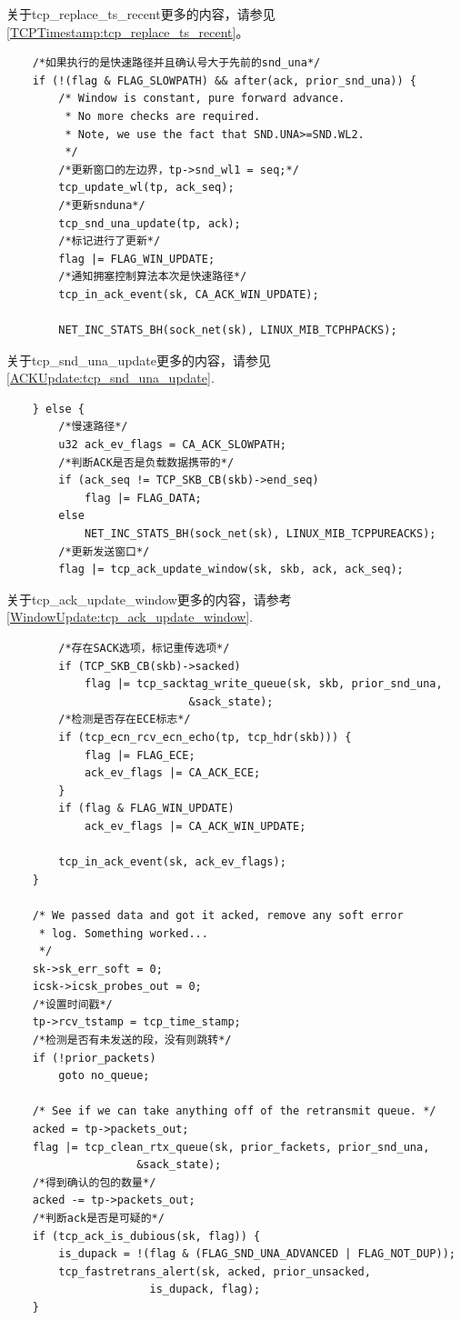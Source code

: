 	关于tcp\_replace\_ts\_recent更多的内容，请参见\ref{TCPTimestamp:tcp_replace_ts_recent}。

\begin{verbatim}
	/*如果执行的是快速路径并且确认号大于先前的snd_una*/
	if (!(flag & FLAG_SLOWPATH) && after(ack, prior_snd_una)) {
		/* Window is constant, pure forward advance.
		 * No more checks are required.
		 * Note, we use the fact that SND.UNA>=SND.WL2.
		 */
		/*更新窗口的左边界，tp->snd_wl1 = seq;*/
		tcp_update_wl(tp, ack_seq);
		/*更新snduna*/
		tcp_snd_una_update(tp, ack);
		/*标记进行了更新*/
		flag |= FLAG_WIN_UPDATE;
		/*通知拥塞控制算法本次是快速路径*/
		tcp_in_ack_event(sk, CA_ACK_WIN_UPDATE);

		NET_INC_STATS_BH(sock_net(sk), LINUX_MIB_TCPHPACKS);
\end{verbatim}

	关于tcp\_snd\_una\_update更多的内容，请参见\ref{ACKUpdate:tcp_snd_una_update}.

\begin{verbatim}
	} else {
		/*慢速路径*/
		u32 ack_ev_flags = CA_ACK_SLOWPATH;
		/*判断ACK是否是负载数据携带的*/
		if (ack_seq != TCP_SKB_CB(skb)->end_seq)
			flag |= FLAG_DATA;
		else
			NET_INC_STATS_BH(sock_net(sk), LINUX_MIB_TCPPUREACKS);
		/*更新发送窗口*/
		flag |= tcp_ack_update_window(sk, skb, ack, ack_seq);
\end{verbatim}

	关于tcp\_ack\_update\_window更多的内容，请参考\ref{WindowUpdate:tcp_ack_update_window}.

\begin{verbatim}
		/*存在SACK选项，标记重传选项*/
		if (TCP_SKB_CB(skb)->sacked)
			flag |= tcp_sacktag_write_queue(sk, skb, prior_snd_una,
							&sack_state);
		/*检测是否存在ECE标志*/
		if (tcp_ecn_rcv_ecn_echo(tp, tcp_hdr(skb))) {
			flag |= FLAG_ECE;
			ack_ev_flags |= CA_ACK_ECE;
		}
		if (flag & FLAG_WIN_UPDATE)
			ack_ev_flags |= CA_ACK_WIN_UPDATE;

		tcp_in_ack_event(sk, ack_ev_flags);
	}

	/* We passed data and got it acked, remove any soft error
	 * log. Something worked...
	 */
	sk->sk_err_soft = 0;
	icsk->icsk_probes_out = 0;
	/*设置时间戳*/
	tp->rcv_tstamp = tcp_time_stamp;
	/*检测是否有未发送的段，没有则跳转*/
	if (!prior_packets)
		goto no_queue;

	/* See if we can take anything off of the retransmit queue. */
	acked = tp->packets_out;
	flag |= tcp_clean_rtx_queue(sk, prior_fackets, prior_snd_una,
				    &sack_state);
	/*得到确认的包的数量*/
	acked -= tp->packets_out;
	/*判断ack是否是可疑的*/
	if (tcp_ack_is_dubious(sk, flag)) {
		is_dupack = !(flag & (FLAG_SND_UNA_ADVANCED | FLAG_NOT_DUP));
		tcp_fastretrans_alert(sk, acked, prior_unsacked,
				      is_dupack, flag);
	}
\end{verbatim}

